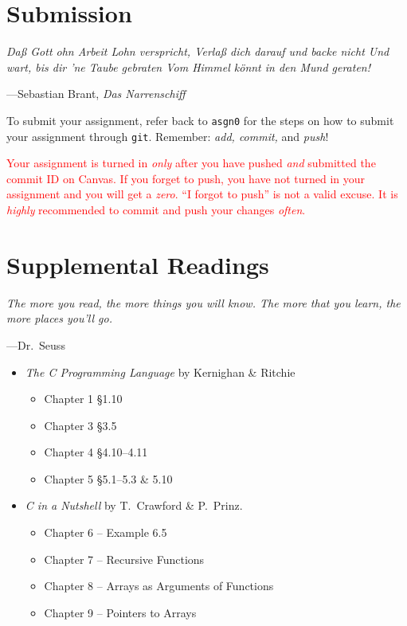 \documentclass[11pt]{article}
\begin{document}
\section{Submission}

\epigraph{\emph{Da\ss{} Gott ohn Arbeit Lohn verspricht, Verla\ss{} dich
darauf und backe nicht Und wart, bis dir 'ne Taube gebraten Vom Himmel
k\"onnt in den Mund geraten!}}{---Sebastian Brant, \emph{Das
Narrenschiff}}

To submit your assignment, refer back to \texttt{asgn0} for the steps on
how to submit your assignment through \texttt{git}.  Remember:
\emph{add, commit,} and \emph{push}!

\textcolor{red}{Your assignment is turned in \emph{only} after you have
  pushed \emph{and} submitted the commit ID on Canvas. If you forget to
  push, you have not turned in your assignment and you will get a
  \emph{zero}. ``I forgot to push'' is not a valid excuse. It is
\emph{highly} recommended to commit and push your changes \emph{often}.}


\section{Supplemental Readings}

\epigraph{\emph{The more you read, the more things you will know. The more that
you learn, the more places you'll go.}}{---Dr.\ Seuss}\noindent

\begin{itemize}
    \item \textit{The C Programming Language} by Kernighan \& Ritchie
    \begin{itemize}
	\item Chapter 1 \S 1.10
	\item Chapter 3 \S 3.5
        \item Chapter 4 \S 4.10--4.11
        \item Chapter 5 \S 5.1--5.3 \& 5.10
    \end{itemize}
     \item  \emph{C in a Nutshell} by T.\ Crawford \& P.\ Prinz.
     \begin{itemize}
      \item Chapter 6 -- Example 6.5		%
      \item Chapter 7 -- Recursive Functions
      \item Chapter 8 -- Arrays as Arguments of Functions
      \item Chapter 9 -- Pointers to Arrays
      \end{itemize}
\end{itemize}
\end{document}
